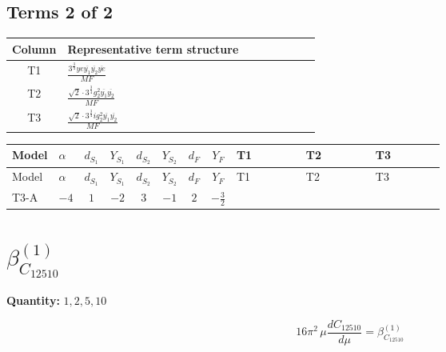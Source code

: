 \documentclass[8pt]{article}
\begin{document}
\begin{landscape}
\subsection*{Terms 2 of 2}
\begin{center}
\begin{tabular}{@{}c >{\raggedright\arraybackslash}p{0.82\linewidth}@{}}
\toprule
Column & Representative term structure \\
\midrule
T1 & \(\displaystyle \frac{3^{\frac{3}{4}} ye \overline{y_{1}} \overline{y_{2}} \overline{ye}}{MF}\) \\
\midrule
T2 & \(\displaystyle \frac{\sqrt{2} \cdot 3^{\frac{3}{4}} g_{2}^{2} \overline{y_{1}} \overline{y_{2}}}{MF}\) \\
\midrule
T3 & \(\displaystyle \frac{\sqrt{2} \cdot 3^{\frac{3}{4}} i g_{2}^{2} \overline{y_{1}} \overline{y_{2}}}{MF}\) \\
\midrule
\bottomrule
\end{tabular}
\end{center}
\smallskip
\tiny
\begin{longtable}{@{}llcccccc >{\raggedright\arraybackslash}p{0.21\linewidth} >{\raggedright\arraybackslash}p{0.21\linewidth} >{\raggedright\arraybackslash}p{0.21\linewidth}@{}}
\toprule
Model & $\alpha$ & $d_{S_1}$ & $Y_{S_1}$ & $d_{S_2}$ & $Y_{S_2}$ & $d_F$ & $Y_F$ & T1 & T2 & T3 \\
\midrule
\endfirsthead
\toprule
Model & $\alpha$ & $d_{S_1}$ & $Y_{S_1}$ & $d_{S_2}$ & $Y_{S_2}$ & $d_F$ & $Y_F$ & T1 & T2 & T3 \\
\midrule
\endhead
T3-A & $-4$ & $1$ & $-2$ & $3$ & $-1$ & $2$ & $-\frac{3}{2}$ & \scriptsize\adjustbox{max width=\linewidth}{$\begin{gathered} - \frac{3^{\frac{3}{4}} ye \overline{y_{1}} \overline{y_{2}} \overline{ye}}{12 MF}\end{gathered}$} & \scriptsize\adjustbox{max width=\linewidth}{$\begin{gathered} \frac{\sqrt{2} \cdot 3^{\frac{3}{4}} g_{2}^{2} \overline{y_{1}} \overline{y_{2}}}{6 MF}\end{gathered}$} & \scriptsize\adjustbox{max width=\linewidth}{$\begin{gathered} - \frac{\sqrt{2} \cdot 3^{\frac{3}{4}} i g_{2}^{2} \overline{y_{1}} \overline{y_{2}}}{6 MF}\end{gathered}$} \\
\midrule
\bottomrule
\end{longtable}
\clearpage
\section*{$\beta_{C_{12510}}^{(1)}$}
\noindent\textbf{Quantity: }$\mathrm{1,2,5,10}$\par\smallskip
\[16\pi^2\,\mu\frac{d C_{12510}}{d\mu}=\beta_{C_{12510}}^{(1)}\]

\end{landscape}
\end{document}
